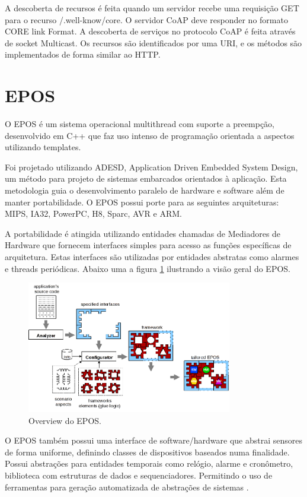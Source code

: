 A descoberta de recursos \'e feita quando um servidor recebe uma requisi\c{c}\~ao GET para o recurso /.well-know/core. O servidor CoAP deve responder no formato CORE link Format\cite{rfc6690}. A descoberta de servi\c{c}os no protocolo CoAP \'e feita atrav\'es de socket Multicast. Os recursos s\~ao identificados por uma URI, e os m\'etodos s\~ao implementados de forma similar ao HTTP.  
\section{EPOS}
O EPOS \'e um sistema operacional multithread com suporte a preemp\c{c}\~ao, desenvolvido em C++ que faz uso intenso de programa\c{c}\~ao orientada a aspectos utilizando templates.

Foi projetado utilizando ADESD, Application Driven Embedded System Design, um m\'etodo para projeto de sistemas embarcados orientados \`a aplica\c{c}\~ao. Esta metodologia guia o desenvolvimento paralelo de hardware e software al\'em de manter portabilidade. O EPOS possui porte para as seguintes arquiteturas: MIPS, IA32, PowerPC, H8, Sparc, AVR e ARM. \cite{eposProject}

A portabilidade \'e atingida utilizando entidades chamadas de Mediadores de Hardware que fornecem interfaces simples para acesso as fun\c{c}\~oes espec\'ificas de arquitetura. Estas interfaces s\~ao utilizadas por entidades abstratas como alarmes e threads peri\'odicas. Abaixo uma a figura \ref{eposOverview} ilustrando a vis\~ao geral do EPOS.

\begin{figure}[H]
   \label{eposOverview}
   \centering
   \includegraphics[width=0.8\textwidth]{figuras/eposOverview.png}
   \caption{Overview do EPOS.}
\end{figure}

 
O EPOS tamb\'em possui uma interface de software/hardware que abstrai sensores de forma uniforme, definindo classes de dispositivos baseados numa finalidade. Possui abstra\c{c}\~oes para entidades temporais como rel\'ogio, alarme e cron\^ometro, biblioteca com estruturas de dados e sequenciadores. Permitindo o uso de ferramentas para gera\c{c}\~ao automatizada de abstra\c{c}\~oes de sistemas \cite{epos}.

